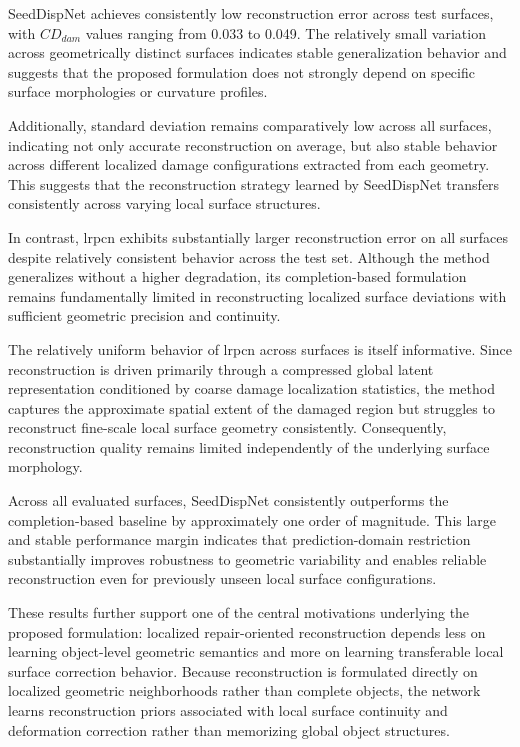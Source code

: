 SeedDispNet achieves consistently low reconstruction error across test surfaces, with ${CD}_{dam}$ values ranging from 0.033 to 0.049. The relatively small variation across geometrically distinct surfaces indicates stable generalization behavior and suggests that the proposed formulation does not strongly depend on specific surface morphologies or curvature profiles.

Additionally, standard deviation remains comparatively low across all surfaces, indicating not only accurate reconstruction on average, but also stable behavior across different localized damage configurations extracted from each geometry. This suggests that the reconstruction strategy learned by SeedDispNet transfers consistently across varying local surface structures.

In contrast, \ac{lrpcn} exhibits substantially larger reconstruction error on all surfaces despite relatively consistent behavior across the test set. Although the method generalizes without a higher degradation, its completion-based formulation remains fundamentally limited in reconstructing localized surface deviations with sufficient geometric precision and continuity.

The relatively uniform behavior of \ac{lrpcn} across surfaces is itself informative. Since reconstruction is driven primarily through a compressed global latent representation conditioned by coarse damage localization statistics, the method captures the approximate spatial extent of the damaged region but struggles to reconstruct fine-scale local surface geometry consistently. Consequently, reconstruction quality remains limited independently of the underlying surface morphology.

Across all evaluated surfaces, SeedDispNet consistently outperforms the completion-based baseline by approximately one order of magnitude. This large and stable performance margin indicates that prediction-domain restriction substantially improves robustness to geometric variability and enables reliable reconstruction even for previously unseen local surface configurations.

These results further support one of the central motivations underlying the proposed formulation: localized repair-oriented reconstruction depends less on learning object-level geometric semantics and more on learning transferable local surface correction behavior. Because reconstruction is formulated directly on localized geometric neighborhoods rather than complete objects, the network learns reconstruction priors associated with local surface continuity and deformation correction rather than memorizing global object structures.

